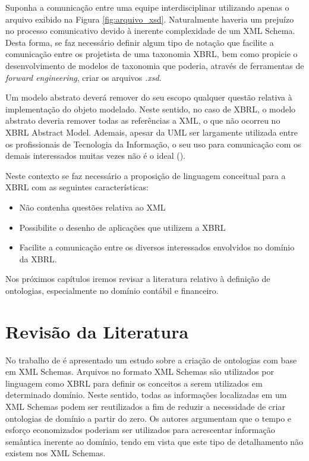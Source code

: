 \documentclass[msc,proposal,hidelot,hideabstract]{ppgccufmg} %
\begin{document}
Suponha a comunicação entre uma equipe interdisciplinar utilizando apenas o arquivo exibido na Figura \ref{fig:arquivo_xsd}. Naturalmente haveria um prejuízo no processo comunicativo devido à inerente complexidade de um XML Schema. Desta forma, se faz necessário definir algum tipo de notação que facilite a comunicação entre os projetista de uma taxonomia XBRL, bem como propicie o desenvolvimento de modelos de taxonomia que poderia, através de ferramentas de \textit{forward engineering}, criar os arquivos \textit{.xsd}{}.

Um modelo abstrato deverá remover do seu escopo qualquer questão relativa à implementação do objeto modelado. Neste sentido, no caso de XBRL, o modelo abstrato deveria remover todas as referências a XML, o que não ocorreu no XBRL Abstract Model. Ademais, apesar da UML ser largamente utilizada entre os profissionais de Tecnologia da Informação, o seu uso para comunicação com os demais interessados muitas vezes não é o ideal (\cite{peixoto2008comparison}).

Neste contexto se faz necessário a proposição de linguagem conceitual para a XBRL com as seguintes características:
 \begin{itemize}
    \item Não contenha questões relativa ao XML
    \item Possibilite o desenho de aplicações que utilizem a XBRL
    \item Facilite a comunicação entre os diversos interessados envolvidos no domínio da XBRL.
 \end{itemize}

Nos próximos capítulos iremos revisar a literatura relativo à definição de ontologias, especialmente no domínio contábil e financeiro.

\chapter{Revisão da Literatura}
\label{ch:revisao}

No trabalho de \cite{Bosch:2013:APD:2575980.2575988} é apresentado um estudo sobre a criação de ontologias com base em XML Schemas. Arquivos no formato XML Schemas são utilizados por linguagem como XBRL para definir os conceitos a serem utilizados em determinado domínio. Neste sentido, todas as informações localizadas em um XML Schemas podem ser reutilizados a fim de reduzir a necessidade de criar ontologias de domínio a partir do zero. Os autores argumentam que o tempo e esforço economizados poderiam ser utilizados para acrescentar informação semântica inerente ao domínio, tendo em vista que este tipo de detalhamento não existem nos XML Schemas.
\end{document}
